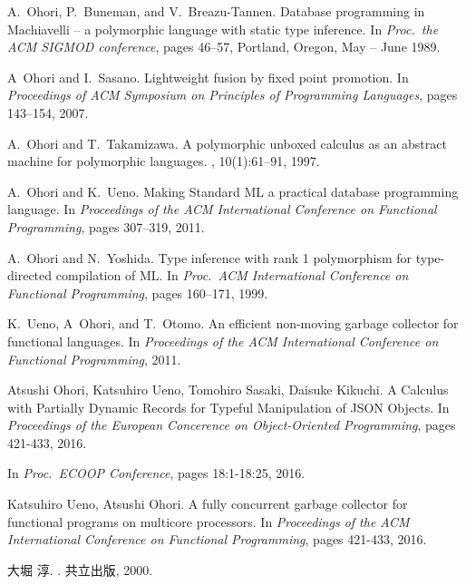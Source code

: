 \documentclass{jbook}
\begin{document}
\begin{thebibliography}{10}
A.~Ohori, P.~Buneman, and V.~Breazu-Tannen.
\newblock Database programming in {Machiavelli} -- a polymorphic language with
  static type inference.
\newblock In {\em Proc.\ the ACM SIGMOD conference}, pages 46--57, Portland,
  Oregon, May -- June 1989.

A~Ohori and I.~Sasano.
\newblock Lightweight fusion by fixed point promotion.
\newblock In {\em Proceedings of ACM Symposium on Principles of Programming
  Languages}, pages 143--154, 2007.

A.~Ohori and T.~Takamizawa.
\newblock A polymorphic unboxed calculus as an abstract machine for polymorphic
  languages.
, 10(1):61--91, 1997.

A.~Ohori and K.~Ueno.
\newblock Making {Standard ML} a practical database programming language.
\newblock In {\em Proceedings of the ACM International Conference on Functional
  Programming}, pages 307--319, 2011.

A.~Ohori and N.~Yoshida.
\newblock Type inference with rank 1 polymorphism for type-directed compilation
  of {ML}.
\newblock In {\em Proc.\ ACM International Conference on Functional
  Programming}, pages 160--171, 1999.

K.~Ueno, A~Ohori, and T.~Otomo.
\newblock An efficient non-moving garbage collector for functional languages.
\newblock In {\em Proceedings of the ACM International Conference on Functional
  Programming}, 2011.

Atsushi Ohori, Katsuhiro Ueno, Tomohiro Sasaki, Daisuke Kikuchi.
\newblock A Calculus with Partially Dynamic Records for Typeful Manipulation of JSON Objects. 
\newblock In {\em Proceedings of the European Concerence on
Object-Oriented  Programming}, pages 421-433, 2016. 

\newblock In {\em Proc.\ ECOOP Conference}, pages 18:1-18:25, 2016.

Katsuhiro Ueno, Atsushi Ohori.
\newblock A fully concurrent garbage collector for functional programs on multicore processors. 
\newblock In {\em Proceedings of the ACM International Conference on Functional
  Programming}, pages 421-433, 2016.


大堀 淳.
.
\newblock 共立出版, 2000.



\end{thebibliography}
 
\end{document}

